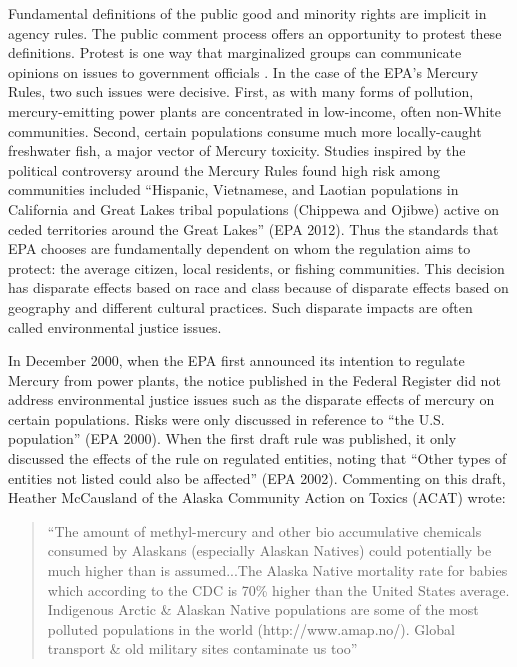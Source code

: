 Fundamental definitions of the public good and minority rights are implicit in agency rules. The public comment process offers an opportunity to protest these definitions. Protest is one way that  marginalized groups can communicate opinions on issues to government officials \citep{Gillion2015ProtestDistrict,Gillion2013ThePolicy}. In the case of the EPA's Mercury Rules, two such issues were decisive. First, as with many forms of pollution, mercury-emitting power plants are concentrated in low-income, often non-White communities. Second, certain populations consume much more locally-caught freshwater fish, a major vector of Mercury toxicity. Studies inspired by the political controversy around the Mercury Rules found high risk among communities included ``Hispanic, Vietnamese, and Laotian populations in California and Great Lakes tribal populations (Chippewa and Ojibwe) active on ceded territories around the Great Lakes'' (EPA 2012). Thus the standards that EPA chooses are fundamentally dependent on whom the regulation aims to protect: the average citizen, local residents, or fishing communities. This decision has disparate effects based on race and class because of disparate effects based on geography and different cultural practices. Such disparate impacts are often called environmental justice issues.

In December 2000, when the EPA first announced its intention to regulate Mercury from power plants, the notice published in the Federal Register did not address environmental justice issues such as the disparate effects of mercury on certain populations. Risks were only discussed in reference to ``the U.S. population'' (EPA 2000). When the first draft rule was published, it only discussed the effects of the rule on regulated entities, noting that ``Other types of entities not listed could also be affected'' (EPA 2002). Commenting on this draft, Heather McCausland of the Alaska Community Action on Toxics (ACAT) wrote:
\begin{quotation}
``The amount of methyl-mercury and other bio accumulative chemicals consumed by Alaskans (especially Alaskan Natives) could potentially be much higher than is assumed...The Alaska Native mortality rate for babies which according to the CDC is 70\% higher than the United States average. Indigenous Arctic \& Alaskan Native populations are some of the most polluted populations in the world (http://www.amap.no/). Global transport \& old military sites contaminate us too''
\end{quotation}

